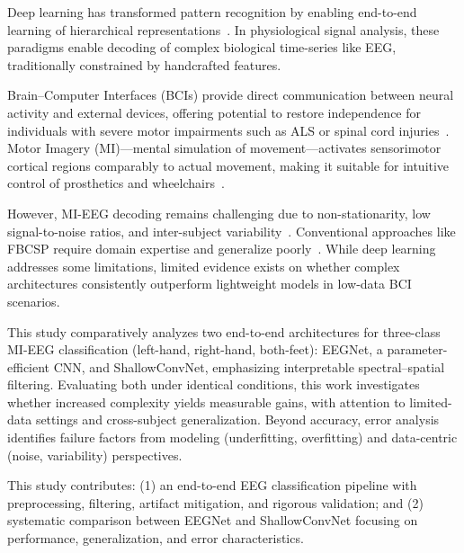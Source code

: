 Deep learning has transformed pattern recognition by enabling end-to-end learning of hierarchical representations~\cite{goodfellow2016deep}. In physiological signal analysis, these paradigms enable decoding of complex biological time-series like EEG, traditionally constrained by handcrafted features.

Brain--Computer Interfaces (BCIs) provide direct communication between neural activity and external devices, offering potential to restore independence for individuals with severe motor impairments such as ALS or spinal cord injuries~\cite{lu2017deep, luo2018lstm}. Motor Imagery (MI)—mental simulation of movement—activates sensorimotor cortical regions comparably to actual movement, making it suitable for intuitive control of prosthetics and wheelchairs~\cite{xu2018wavelet}.

However, MI-EEG decoding remains challenging due to non-stationarity, low signal-to-noise ratios, and inter-subject variability~\cite{autthasan2021min2net}. Conventional approaches like FBCSP require domain expertise and generalize poorly~\cite{xu2019deep}. While deep learning addresses some limitations, limited evidence exists on whether complex architectures consistently outperform lightweight models in low-data BCI scenarios.

This study comparatively analyzes two end-to-end architectures for three-class MI-EEG classification (left-hand, right-hand, both-feet): EEGNet, a parameter-efficient CNN, and ShallowConvNet, emphasizing interpretable spectral--spatial filtering. Evaluating both under identical conditions, this work investigates whether increased complexity yields measurable gains, with attention to limited-data settings and cross-subject generalization. Beyond accuracy, error analysis identifies failure factors from modeling (underfitting, overfitting) and data-centric (noise, variability) perspectives.

This study contributes: (1) an end-to-end EEG classification pipeline with preprocessing, filtering, artifact mitigation, and rigorous validation; and (2) systematic comparison between EEGNet and ShallowConvNet focusing on performance, generalization, and error characteristics.
